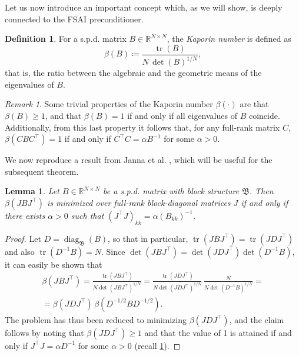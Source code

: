 \documentclass[a4paper]{article}
\DeclareMathOperator{\trace}{tr}
\DeclareMathOperator{\diag}{diag}
\theoremstyle{plain}
\newtheorem{lemma}{Lemma}[section]
\theoremstyle{definition}
\newtheorem{definition}{Definition}[section]
\theoremstyle{remark}
\newtheorem{remark}{Remark}[section]
\begin{document}
Let us now introduce an important concept which, as we will show, is deeply connected to the FSAI preconditioner.

\begin{definition}\label{def:kaporin_number}
	For a s.p.d. matrix \(B\in\mathbb{R}^{N\times N}\), the \emph{Kaporin number} is defined as
	\begin{equation*}
		\beta(B) \coloneqq \frac{\trace(B)}{N \,\det(B)^{1/N}},
	\end{equation*}
	that is, the ratio between the algebraic and the geometric means of the eigenvalues of \(B\).
\end{definition}

\begin{remark}\label{rm:kaporin_properties}
	Some trivial properties of the Kaporin number \(\beta(\cdot)\) are that \(\beta(B) \geq 1\), and that \(\beta(B) = 1\) if and only if all eigenvalues of \(B\) coincide. Additionally, from this last property it follows that, for any full-rank matrix \(C\), \(\beta(C B C^{\top}) = 1\) if and only if \(C^{\top} C = \alpha B^{-1}\) for some \(\alpha > 0\).
\end{remark}

We now reproduce a result from Janna et al. \cite{Janna2011}, which will be useful for the subsequent theorem.

\begin{lemma}\label{thm:optimal_diagonal_scaling}
	Let \(B \in \mathbb{R}^{N\times N}\) be a s.p.d. matrix with block structure \(\mathfrak{B}\). Then \(\beta(J B J^{\top})\) is minimized over full-rank block-diagonal matrices \(J\) if and only if there exists \(\alpha > 0\) such that \((J^{\top} J)_{kk} = \alpha (B_{kk})^{-1}\).
\end{lemma}
\begin{proof}
	Let \(D = \diag_{\mathfrak{B}}(B)\), so that in particular, \(\trace(J B J^{\top}) = \trace(J D J^{\top})\) and also \(\trace(D^{-1} B) = N\). Since \(\det(J B J^{\top}) = \det(J D J^{\top}) \det(D^{-1} B)\), it can easily be shown that
	\begin{multline*}
		\beta(J B J^{\top}) = \frac{\trace(J B J^{\top})}{N \det(J B J^{\top})^{1/N}} = \frac{\trace(J D J^{\top})}{N \det(J D J^{\top})^{1/N}} \, \frac{N}{N \det(D^{-1} B)^{1/N}} =\\
		= \beta(J D J^{\top}) \, \beta(D^{-1/2} B D^{-1/2}).
	\end{multline*}
	The problem has thus been reduced to minimizing \(\beta(J D J^{\top})\), and the claim follows by noting that \(\beta(J D J^{\top}) \geq 1\) and that the value of 1 is attained if and only if \(J^{\top}J = \alpha D^{-1}\) for some \(\alpha > 0\) (recall \cref{rm:kaporin_properties}).
\end{proof}
\end{document}
